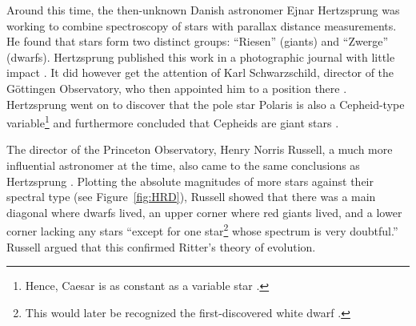 
Around this time, the then-unknown Danish astronomer Ejnar Hertzsprung was working to combine spectroscopy of stars with parallax distance measurements. 
He found that stars form two distinct groups: ``Riesen'' (giants) and ``Zwerge'' (dwarfs). 
Hertzsprung published this work in a photographic journal with little impact \citep{1905WisZP...3..442H, 1907WisZP...5...86H}. 
It did however get the attention of Karl Schwarzschild, director of the G\"ottingen Observatory, who then appointed him to a position there \citep[e.g.,][]{bolt2007biographical}. 
Hertzsprung went on to discover that the pole star Polaris is also a Cepheid-type variable\footnote{ Hence, Caesar is as constant as a variable star \citep{shakespeare}.} \citep{1911AN....189...89H} and furthermore concluded that Cepheids are giant stars \citep{1913AN....196..201H}. 

The director of the Princeton Observatory, Henry Norris Russell, a much more influential astronomer at the time, also came to the same conclusions as Hertzsprung \citep[e.g.,][]{1913Obs....36..324R, 1913Sci....37..651R}. 
Plotting the absolute magnitudes of more stars against their spectral type (see Figure~\ref{fig:HRD}), Russell showed that there was a main diagonal where dwarfs lived, an upper corner where red giants lived, and a lower corner lacking any stars ``except for one star\footnote{ This would later be recognized the first-discovered white dwarf \citep[e.g.,][]{1958whdw.book.....S}.} whose spectrum is very doubtful.'' 
Russell argued that this confirmed Ritter's theory of evolution. 

